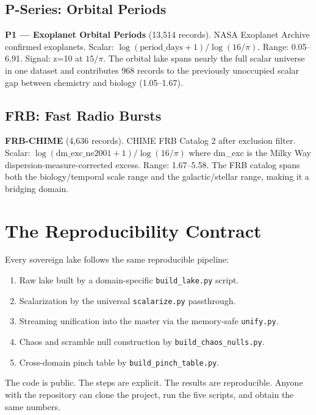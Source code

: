 \documentclass[11pt, letterpaper, openany]{book}
\begin{document}
\subsection*{P-Series: Orbital Periods}

\textbf{P1 --- Exoplanet Orbital Periods} (13,514 records). NASA Exoplanet Archive confirmed
exoplanets. Scalar: $\log(\text{period\_days} + 1)/\log(16/\pi)$. Range: 0.05--6.91.
Signal: z=10 at $15/\pi$. The orbital lake spans nearly the full scalar universe in one dataset
and contributes 968 records to the previously unoccupied scalar gap between chemistry and
biology (1.05--1.67).

\subsection*{FRB: Fast Radio Bursts}

\textbf{FRB-CHIME} (4,636 records). CHIME FRB Catalog 2 after exclusion filter. Scalar:
$\log(\text{dm\_exc\_ne2001} + 1)/\log(16/\pi)$ where dm\_exc is the Milky Way
dispersion-measure-corrected excess. Range: 1.67--5.58. The FRB catalog spans both the
biology/temporal scale range and the galactic/stellar range, making it a bridging domain.

\section*{The Reproducibility Contract}

Every sovereign lake follows the same reproducible pipeline:

\begin{enumerate}
    \item Raw lake built by a domain-specific \texttt{build\_lake.py} script.
    \item Scalarization by the universal \texttt{scalarize.py} passthrough.
    \item Streaming unification into the master via the memory-safe \texttt{unify.py}.
    \item Chaos and scramble null construction by \texttt{build\_chaos\_nulls.py}.
    \item Cross-domain pinch table by \texttt{build\_pinch\_table.py}.
\end{enumerate}

The code is public. The steps are explicit. The results are reproducible. Anyone with the
repository can clone the project, run the five scripts, and obtain the same numbers.
\end{document}

